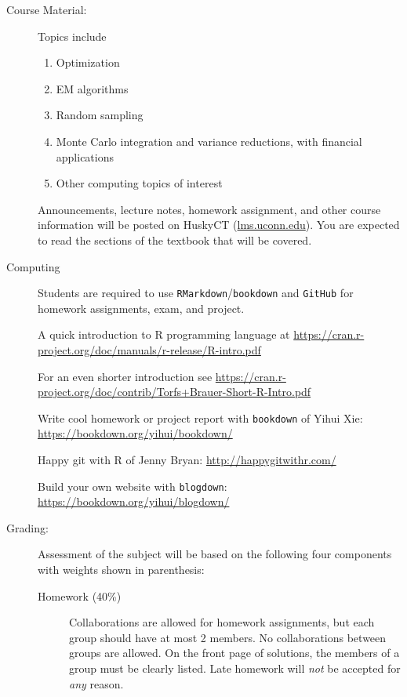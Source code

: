 \documentclass[twocolumn]{article}
\begin{document}
\begin{description}
\item[Course Material:]
Topics include
\begin{enumerate}[noitemsep]
\item Optimization
\item EM algorithms
\item Random sampling
\item Monte Carlo integration and variance reductions, with financial applications
\item Other computing topics of interest
\end{enumerate}

Announcements, lecture notes, homework assignment, and other course
information will be posted on HuskyCT (\url{lms.uconn.edu}). 
You are expected to read the sections of the textbook that will be covered.

\item[Computing]
Students are required to use \texttt{RMarkdown}/\texttt{bookdown} and
\texttt{GitHub} for homework assignments, exam, and project.


A quick introduction to R programming language at
\url{https://cran.r-project.org/doc/manuals/r-release/R-intro.pdf}

For an even shorter introduction see
\url{https://cran.r-project.org/doc/contrib/Torfs+Brauer-Short-R-Intro.pdf}

Write cool homework or project report with \texttt{bookdown} of Yihui Xie:
\url{https://bookdown.org/yihui/bookdown/}


Happy git with R of Jenny Bryan:
\url{http://happygitwithr.com/}

Build your own website with \texttt{blogdown}:
\url{https://bookdown.org/yihui/blogdown/}


\item[Grading:] Assessment of the subject will be based on 
the following four components with weights shown in parenthesis:

\begin{description}
\item[Homework (40\%)]
Collaborations are allowed for homework assignments, but each group
should have at most 2 members. No collaborations between groups are
allowed. On the front page of solutions, the members of a group must be
clearly listed. Late homework will \emph{not} be accepted for \emph{any}
reason. 


\end{description}
\end{description}
\end{document}
